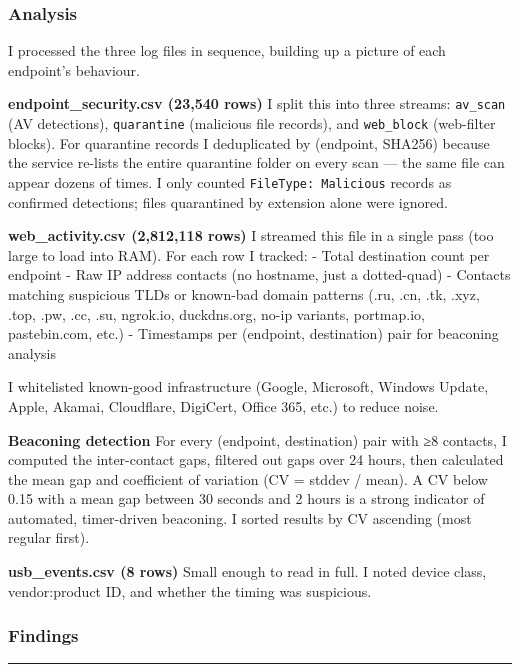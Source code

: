 \documentclass[
]{article}
\begin{document}
\subsubsection{Analysis}\label{analysis}

I processed the three log files in sequence, building up a picture of
each endpoint's behaviour.

\textbf{endpoint\_security.csv (23,540 rows)} I split this into three
streams: \texttt{av\_scan} (AV detections), \texttt{quarantine}
(malicious file records), and \texttt{web\_block} (web-filter blocks).
For quarantine records I deduplicated by (endpoint, SHA256) because the
service re-lists the entire quarantine folder on every scan --- the same
file can appear dozens of times. I only counted
\texttt{FileType:\ Malicious} records as confirmed detections; files
quarantined by extension alone were ignored.

\textbf{web\_activity.csv (2,812,118 rows)} I streamed this file in a
single pass (too large to load into RAM). For each row I tracked: -
Total destination count per endpoint - Raw IP address contacts (no
hostname, just a dotted-quad) - Contacts matching suspicious TLDs or
known-bad domain patterns (.ru, .cn, .tk, .xyz, .top, .pw, .cc, .su,
ngrok.io, duckdns.org, no-ip variants, portmap.io, pastebin.com, etc.) -
Timestamps per (endpoint, destination) pair for beaconing analysis

I whitelisted known-good infrastructure (Google, Microsoft, Windows
Update, Apple, Akamai, Cloudflare, DigiCert, Office 365, etc.) to reduce
noise.

\textbf{Beaconing detection} For every (endpoint, destination) pair with
≥8 contacts, I computed the inter-contact gaps, filtered out gaps over
24 hours, then calculated the mean gap and coefficient of variation (CV
= stddev / mean). A CV below 0.15 with a mean gap between 30 seconds and
2 hours is a strong indicator of automated, timer-driven beaconing. I
sorted results by CV ascending (most regular first).

\textbf{usb\_events.csv (8 rows)} Small enough to read in full. I noted
device class, vendor:product ID, and whether the timing was suspicious.

\subsubsection{Findings}\label{findings}

\begin{center}\rule{0.5\linewidth}{0.5pt}\end{center}
\end{document}
